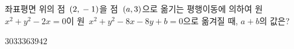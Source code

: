 좌표평면 위의 점~$(2{,}\mkern3mu -1)$을 점~$(a{,}\mkern3mu 3)$으로 옮기는 평행이동에 의하여 원~$x^2+y^2-2x=0$이 원~$x^2+y^2-8x-8y+b=0$으로 옮겨질 때, $a+b$의 값은? 
\begin{choices32}{$30$}{$33$}{$36$}{$39$}{$42$}\end{choices32}
